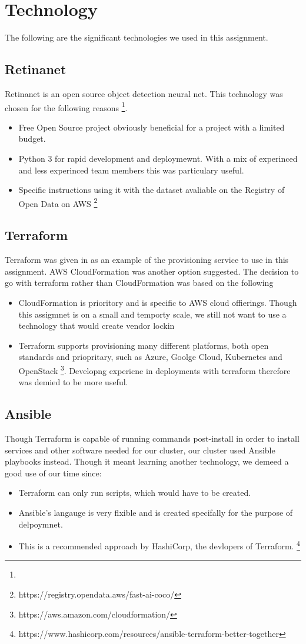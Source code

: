 \documentclass[conference]{IEEEtran}
\begin{document}
\section{Technology}
The following are the significant technologies we used in this assignment.
\subsection{Retinanet}
Retinanet is an open source object detection neural net. This technology was chosen for the following reasons \footnote{}.
\begin{itemize}
\item Free Open Source project obviously beneficial for a project with a limited budget.
\item Python 3 for rapid development and deploymewnt. With a mix of experinced and less experinced team members this was particulary useful.
\item Specific instructions using it with the dataset avaliable on the Registry of Open Data on AWS \footnote{https://registry.opendata.aws/fast-ai-coco/}
\end{itemize}
\subsection{Terraform}
Terraform was given in as an example of the provisioning service to use in this assignment. AWS CloudFormation was another option suggested. The decision to go with terraform rather than CloudFormation was based on the following
\begin{itemize}
  \item CloudFormation is prioritory and is specific to AWS cloud offierings. Though this assigmnet is on a small and temporty scale, we still not want to use a technology that would create vendor lockin
  \item Terraform supports provisioning many different platforms, both open standards and priopritary, such as Azure, Goolge Cloud, Kubernetes and OpenStack \footnote{https://aws.amazon.com/cloudformation/}. Developng expericne in deployments with terraform therefore was demied to be more useful.
\end{itemize}
\subsection{Ansible}
Though Terraform is capable of running commands post-install in order to install services and other software needed for our cluster, our cluster used Ansible playbooks instead. Though it meant learning another technology, we demeed a good use of our time since:
\begin{itemize}
  \item Terraform can only run scripts, which would have to be created.
  \item Ansible's langauge is very flxible and is created specifally for the purpose of delpoymnet.
  \item This is a recommended approach by HashiCorp, the devlopers of Terraform. \footnote{https://www.hashicorp.com/resources/ansible-terraform-better-together}
\end{itemize}
\end{document}

